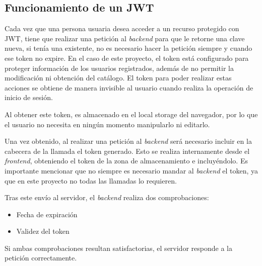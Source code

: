 \subsection{Funcionamiento de un JWT }
Cada vez que una persona usuaria desea acceder a un recurso protegido con JWT, tiene que realizar una petición al \textit{backend} para que le retorne una clave nueva, si tenía una existente, no es necesario hacer la petición siempre y cuando ese token no expire.
En el caso de este proyecto, el token está configurado para proteger información de los usuarios registrados, además de no permitir la modificación ni obtención del catálogo. El token para poder realizar estas acciones se obtiene de manera invisible al usuario cuando realiza la operación de inicio de sesión.

Al obtener este token, es almacenado en el local storage del navegador, por lo que el usuario no necesita en ningún momento manipularlo ni editarlo.

Una vez obtenido, al realizar una petición al \textit{backend} será necesario incluir en la cabecera de la llamada el token generado. Esto se realiza internamente desde el \textit{frontend}, obteniendo el token de la zona de almacenamiento e incluyéndolo. Es importante mencionar que no siempre es necesario mandar al \textit{backend} el token, ya que en este proyecto no todas las llamadas lo requieren.

Tras este envío al servidor, el \textit{backend} realiza dos comprobaciones:
\begin{itemize}
    \item Fecha de expiración
    \item Validez del token
\end{itemize}
Si ambas comprobaciones resultan satisfactorias, el servidor responde a la petición correctamente.


